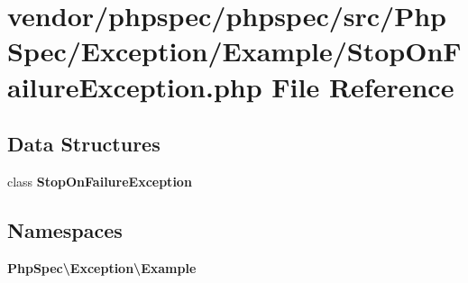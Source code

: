 \section{vendor/phpspec/phpspec/src/\+Php\+Spec/\+Exception/\+Example/\+Stop\+On\+Failure\+Exception.php File Reference}
\label{_stop_on_failure_exception_8php}
\subsection*{Data Structures}
\begin{DoxyCompactItemize}
\item 
class {\bf Stop\+On\+Failure\+Exception}
\end{DoxyCompactItemize}
\subsection*{Namespaces}
\begin{DoxyCompactItemize}
\item 
 {\bf Php\+Spec\textbackslash{}\+Exception\textbackslash{}\+Example}
\end{DoxyCompactItemize}
